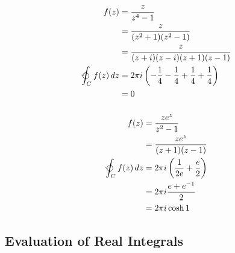 \documentclass{article}
\begin{document}
\begin{align*}
  f(z)                              & = \frac{z}{z^4 - 1}                                                             \\
                                    & = \frac{z}{(z^2 + 1) (z^2 - 1)}                                                 \\
                                    & = \frac{z}{(z + i) (z - i) (z + 1) (z - 1)}                                     \\
  \varointctrclockwise_C f(z) \,d z & = 2 \pi i \left( -\frac{1}{4} - \frac{1}{4} + \frac{1}{4} + \frac{1}{4} \right) \\
                                    & = 0
\end{align*}

\setcounter{subsubsection}{24}
\subsubsection{}

\begin{align*}
  f(z)                              & = \frac{z e^z}{z^2 - 1}                              \\
                                    & = \frac{z e^z}{(z + 1) (z - 1)}                      \\
  \varointctrclockwise_C f(z) \,d z & = 2 \pi i \left( \frac{1}{2 e} + \frac{e}{2} \right) \\
                                    & = 2 \pi i \frac{e + e^{-1}}{2}                       \\
                                    & = 2 \pi i \cosh 1
\end{align*}

\subsection{Evaluation of Real Integrals}

\subsubsection{}
\end{document}
